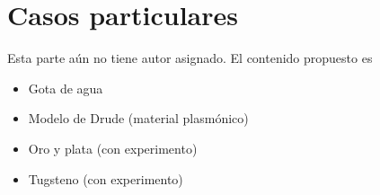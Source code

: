 \documentclass[12pts,a4paper]{book}
\begin{document}
\chapter{Casos particulares}
\label{ch:AEV} %
Esta parte aún no tiene autor asignado. El contenido propuesto es

\begin{itemize}
 \item Gota de agua
 \item Modelo de Drude (material plasmónico)
 \item Oro y plata (con experimento)
 \item Tugsteno (con experimento)
\end{itemize}

%
%

\printbibliography

\printindex
\end{document}
